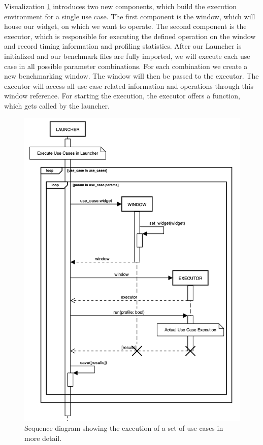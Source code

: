 Visualization \ref{fig:application:design:launcher} introduces two new
components, which build the execution environment for a single use case. The
first component is the window, which will house our widget, on which we want to
operate. The second component is the executor, which is responsible for
executing the defined operation on the window and record timing information and
profiling statistics. After our Launcher is initialized and our benchmark files
are fully imported, we will execute each use case in all possible parameter
combinations. For each combination we create a new benchmarking window. The
window will then be passed to the executor. The executor will access all use
case related information and operations through this window reference. For
starting the execution, the executor offers a 
function, which gets called by the launcher.

\begin{figure}[h]
    \centering
    \includegraphics[width=12cm]{resources/img/sequence/launcher}
    \caption{
        Sequence diagram showing the execution of a set of use cases in more
        detail.
    }
    \label{fig:application:design:launcher}
\end{figure}

